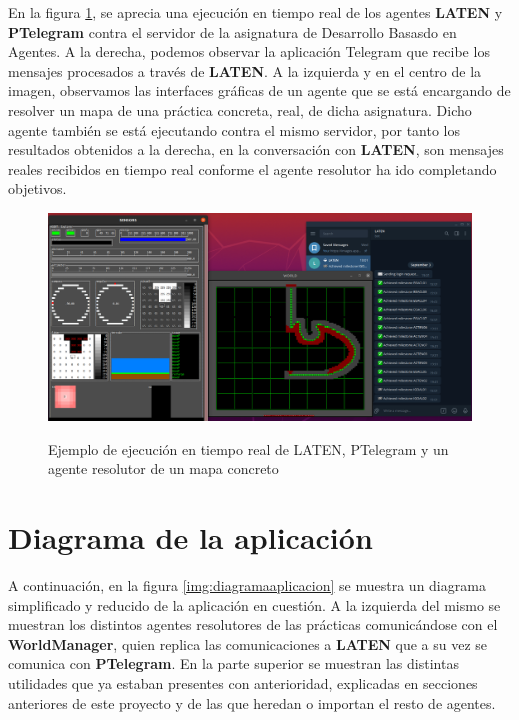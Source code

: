 En la figura \ref{img:ejecucion1}, se aprecia una ejecución en tiempo real de los agentes \textbf{LATEN} y \textbf{PTelegram} contra el servidor de la asignatura de Desarrollo Basasdo en Agentes. A la derecha, podemos observar la aplicación Telegram que recibe los mensajes procesados a través de \textbf{LATEN}. A la izquierda y en el centro de la imagen, observamos las interfaces gráficas de un agente que se está encargando de resolver un mapa de una práctica concreta, real, de dicha asignatura. Dicho agente también se está ejecutando contra el mismo servidor, por tanto los resultados obtenidos a la derecha, en la conversación con \textbf{LATEN}, son mensajes reales recibidos en tiempo real conforme el agente resolutor ha ido completando objetivos.

\begin{figure}[h]
\centering
\includegraphics[width=1.1\textwidth]{logos/ejecucion1.png}\\[1.4cm]
\caption{Ejemplo de ejecución en tiempo real de LATEN, PTelegram y un agente resolutor de un mapa concreto}
\label{img:ejecucion1}
\end{figure}

\section{Diagrama de la aplicación}

A continuación, en la figura \ref{img:diagramaaplicacion} se muestra un diagrama simplificado y reducido de la aplicación en cuestión. A la izquierda del mismo se muestran los distintos agentes resolutores de las prácticas comunicándose con el \textbf{WorldManager}, quien replica las comunicaciones a \textbf{LATEN} que a su vez se comunica con \textbf{PTelegram}. En la parte superior se muestran las distintas utilidades que ya estaban presentes con anterioridad, explicadas en secciones anteriores de este proyecto y de las que heredan o importan el resto de agentes.

